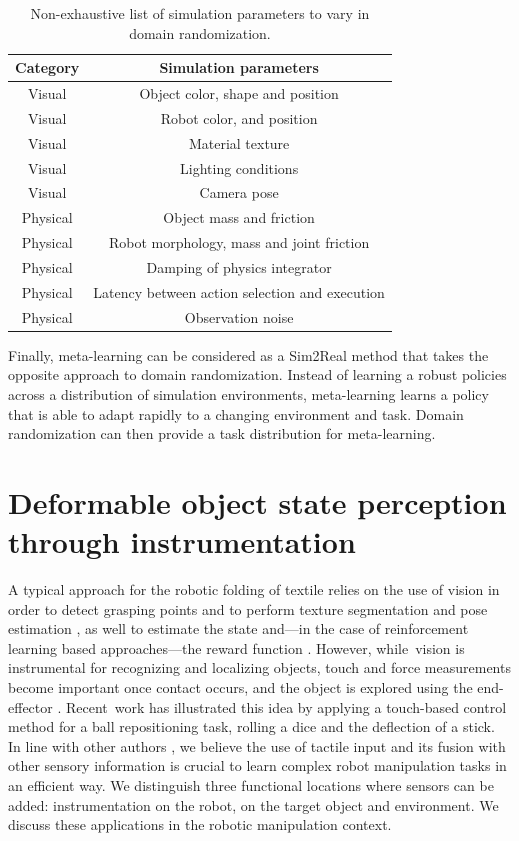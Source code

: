 \documentclass[\home/main.tex]{subfiles}
\begin{document}
\begin{table}[htb]
\centering
\caption{Non-exhaustive list of simulation parameters to vary in domain randomization.}
\begin{tabular}[t]{c c}
	\toprule
	Category    &   Simulation parameters	 						\\
	\midrule
	Visual     	&   Object color, shape and position				\\
	Visual     	&   Robot color, and position						\\
	Visual		&   Material texture								\\
	Visual     	&   Lighting conditions								\\
	Visual     	&   Camera pose										\\
	Physical	& 	Object mass and friction 						\\
	Physical	& 	Robot morphology, mass and joint friction 		\\
	Physical	&  	Damping of physics integrator					\\
	Physical	& 	Latency between action selection and execution 	\\
	Physical	& 	Observation noise 								\\
	\bottomrule
\end{tabular}
\label{table:simulation_parameters_example}
\end{table}

Finally, meta-learning can be considered as a Sim2Real method that takes the opposite approach to domain randomization. Instead of learning a robust policies across a distribution of simulation environments, meta-learning learns a policy that is able to adapt rapidly to a changing environment and task. Domain randomization can then provide a task distribution for meta-learning. 

\section{Deformable object state perception through instrumentation} \label{sec:lit_instrumentation}

A typical approach for the robotic folding of textile relies on the use of vision in order to detect grasping points and to perform texture segmentation and pose estimation \autocite{Maitin2010, Doumanoglou2016, Bersch2011}, as well to estimate the state \autocite{Matas2018} and---in the case of reinforcement learning based approaches---the reward function \autocite{Tsurumine2019}. However, while~vision is instrumental for recognizing and localizing objects, touch and force measurements become important once contact occurs, and the object is explored using the end-effector \autocite{Billard2019}. Recent~work \autocite{Tian2019} has illustrated this idea by applying a touch-based control method for a ball repositioning task, rolling a dice and the deflection of a stick. In line with other authors \autocite{Tian2019, Lee2019}, we believe the use of tactile input and its fusion with other sensory information is crucial to learn complex robot manipulation tasks in an efficient way. We distinguish three functional locations where sensors can be added: instrumentation on the robot, on the target object and environment. We discuss these applications in the robotic manipulation context.
\end{document}
